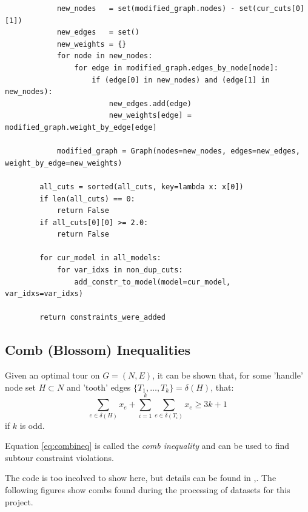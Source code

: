 \documentclass{article}
\begin{document}
\begin{flushleft}
\begin{flushleft}
\begin{flushleft}
\begin{lstlisting}
            new_nodes   = set(modified_graph.nodes) - set(cur_cuts[0][1])
            new_edges   = set()
            new_weights = {}
            for node in new_nodes:
                for edge in modified_graph.edges_by_node[node]:
                    if (edge[0] in new_nodes) and (edge[1] in new_nodes):
                        new_edges.add(edge)
                        new_weights[edge] = modified_graph.weight_by_edge[edge]

            modified_graph = Graph(nodes=new_nodes, edges=new_edges, weight_by_edge=new_weights)

        all_cuts = sorted(all_cuts, key=lambda x: x[0])
        if len(all_cuts) == 0:
            return False
        if all_cuts[0][0] >= 2.0:
            return False

        for cur_model in all_models:
            for var_idxs in non_dup_cuts:
                add_constr_to_model(model=cur_model, var_idxs=var_idxs)

        return constraints_were_added
\end{lstlisting}

\end{flushleft}

\end{flushleft}

\subsection{Comb (Blossom) Inequalities}
\begin{flushleft}

Given an optimal tour on $G = (N,E)$,
it can be shown that,
for some 'handle' node set $H \subset N$
and 'tooth' edges $\{ T_1,\ldots,T_k \} = \delta(H)$,
that:
\begin{equation} \label{eq:combineq}
  \sum_{e \in \delta(H)}{x_e} + \sum_{i = 1}^{k}{ \sum_{e \in \delta(T_i)}{x_e} } \geq 3k + 1
\end{equation}
if $k$ is odd.

Equation \eqref{eq:combineq} is called the \textit{comb inequality}
and can be used to find subtour constraint violations.

The code is too incolved to show here,
but details can be found in \cite{tspproblem},\cite{ico}.
The following figures show combs found
during the processing of datasets
for this project.


\end{flushleft}
\end{flushleft}
\end{document}
